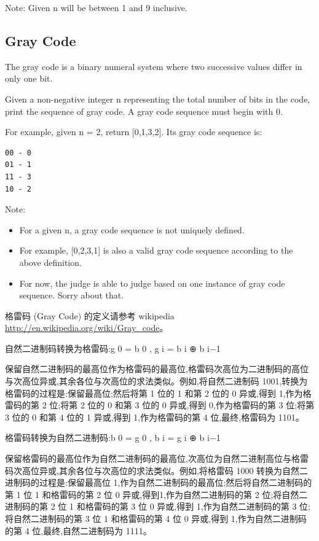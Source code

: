 \documentclass[12pt]{book}
\begin{document}
Note: Given n will be between 1 and 9 inclusive.
\subsection{Gray Code}
\label{sec-16-1-2}
The gray code is a binary numeral system where two successive values differ in only one bit.

Given a non-negative integer n representing the total number of bits in the code, print the sequence of gray code. A gray code sequence must begin with 0.

For example, given n = 2, return [0,1,3,2]. Its gray code sequence is:
\lstset{language=java,label= ,caption= ,numbers=none}
\begin{lstlisting}
00 - 0
01 - 1
11 - 3
10 - 2
\end{lstlisting}
Note:
\begin{itemize}
\item For a given n, a gray code sequence is not uniquely defined.
\item For example, [0,2,3,1] is also a valid gray code sequence according to the above definition.
\item For now, the judge is able to judge based on one instance of gray code sequence. Sorry about that.
\end{itemize}

格雷码 (Gray Code) 的定义请参考 wikipedia \url{http://en.wikipedia.org/wiki/Gray_code}。

自然二进制码转换为格雷码:g 0 = b 0 , g i = b i ⊕ b i−1

保留自然二进制码的最高位作为格雷码的最高位,格雷码次高位为二进制码的高位与次高位异或,其余各位与次高位的求法类似。例如,将自然二进制码 1001,转换为格雷码的过程是:保留最高位;然后将第 1 位的 1 和第 2 位的 0 异或,得到 1,作为格雷码的第 2 位;将第 2 位的 0 和第 3 位的 0 异或,得到 0,作为格雷码的第 3 位;将第 3 位的 0 和第 4 位的 1 异或,得到 1,作为格雷码的第 4 位,最终,格雷码为 1101。

格雷码转换为自然二进制码:b 0 = g 0 , b i = g i ⊕ b i−1

保留格雷码的最高位作为自然二进制码的最高位,次高位为自然二进制高位与格雷码次高位异或,其余各位与次高位的求法类似。例如,将格雷码 1000 转换为自然二进制码的过程是:保留最高位 1,作为自然二进制码的最高位;然后将自然二进制码的第 1 位 1 和格雷码的第 2 位 0 异或,得到1,作为自然二进制码的第 2 位;将自然二进制码的第 2 位 1 和格雷码的第 3 位 0 异或,得到 1,作为自然二进制码的第 3 位;将自然二进制码的第 3 位 1 和格雷码的第 4 位 0 异或,得到 1,作为自然二进制码的第 4 位,最终,自然二进制码为 1111。
\end{document}
